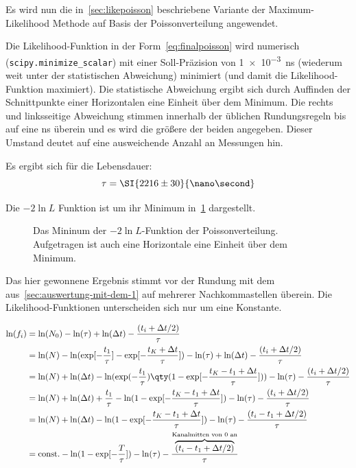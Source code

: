 \documentclass[slug=LM, room=Andreas-Schubert-Bau\,\ K\ 1A, supervisor=Anne-Sophie\ Berthold, coursedate=13.\ 12.\ 2019]{../../Lab_Report_LaTeX/lab_report}
\begin{document}
Es wird nun die in~\ref{sec:likepoisson} beschriebene Variante der
Maximum-Likelihood Methode auf Basis der Poissonverteilung angewendet.

Die Likelihood-Funktion in der Form~\ref{eq:finalpoisson} wird
numerisch (\verb|scipy.minimize_scalar|) mit einer Soll-Pr\"azision
von \SI{1e-3}{\nano\second} (wiederum weit unter der statistischen
Abweichung) minimiert (und damit die Likelihood-Funktion maximiert). Die
statistische Abweichung ergibt sich durch Auffinden der Schnittpunkte
einer Horizontalen eine Einheit \"uber dem Minimum. Die rechts und
linksseitige Abweichung stimmen innerhalb der \"ublichen
Rundungsregeln bis auf eine \si{\nano\second} \"uberein und es wird
die gr\"o\ss{}ere der beiden angegeben. Dieser Umstand deutet auf eine
ausweichende Anzahl an Messungen hin.

Es ergibt sich f\"ur die Lebensdauer:
\begin{equation}
  \label{eq:result-poisson}
  \tau = \SI{2216\pm 30}{\nano\second}
\end{equation}

Die \(-2\ln{L}\) Funktion ist um ihr Minimum
in~\ref{fig:haupt-poisson} dargestellt.

\begin{figure}[h]\centering
  
  \caption{Das Mininum der \(-2\ln{L}\)-Funktion der
    Poissonverteilung. Aufgetragen ist auch eine Horizontale eine
    Einheit \"uber dem Minimum.}
  \label{fig:haupt-poisson}
\end{figure}

Das hier gewonnene Ergebnis stimmt vor der Rundung mit dem
aus~\ref{sec:auswertung-mit-dem-1} auf mehrerer Nachkommastellen
\"uberein. Die Likelihood-Funktionen unterscheiden sich nur um eine
Konstante. 

\begin{align*}
  \ln(f_i) &= \ln(N_0) - \ln(\tau) + \ln(\Delta t) - \frac{(t_i  + \Delta t/2)}{\tau}
  \\
  &= \ln(N) - \ln(\exp[-\frac{t_1}{\tau}]-\exp[-\frac{t_K+\Delta
    t}{\tau}]) - \ln(\tau) + \ln(\Delta t) - \frac{(t_i  + \Delta t/2)}{\tau} \\
  &= \ln(N) + \ln(\Delta t) - \ln(\exp(-\frac{t_1}{\tau})\qty(1-\exp[-\frac{t_K-t_1+\Delta
    t}{\tau}])) - \ln(\tau) - \frac{(t_i  + \Delta t/2)}{\tau} \\
  &= \ln(N) + \ln(\Delta t) + \frac{t_1}{\tau} - \ln(1-\exp[-\frac{t_K-t_1+\Delta
    t}{\tau}]) - \ln(\tau) - \frac{(t_i  + \Delta t/2)}{\tau} \\
  &= \ln(N) + \ln(\Delta t) - \ln(1-\exp[-\frac{t_K-t_1+\Delta
    t}{\tau}]) - \ln(\tau) - \frac{(t_i - t_1  + \Delta t/2)}{\tau} \\
  &= \text{const.} - \ln(1-\exp[-\frac{T}{\tau}]) - \ln(\tau) -
  \frac{\overbrace{(t_i - t_1  + \Delta t/2)}^{\text{Kanalmitten von 0
      an}}}{\tau} \\
\end{align*}
\end{document}
